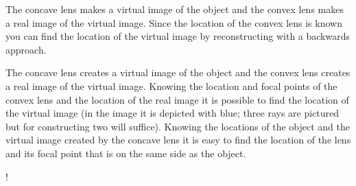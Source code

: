 \hinteng
The concave lens makes a virtual image of the object and the convex lens makes a real image of the virtual image. Since the location of the convex lens is known you can find the location of the virtual image by reconstructing with a backwards approach.

\solueng
The concave lens creates a virtual image of the object and the convex lens creates a real image of the virtual image. Knowing the location and focal points of the convex lens and the location of the real image it is possible to find the location of the virtual image (in the image it is depicted with blue; three rays are pictured but for constructing two will suffice). Knowing the locations of the object and the virtual image created by the concave lens it is easy to find the location of the lens and its focal point that is on the same side as the object.\\
\begin{resizebox}{\linewidth}{!}{
		}
\end{resizebox}
\probend